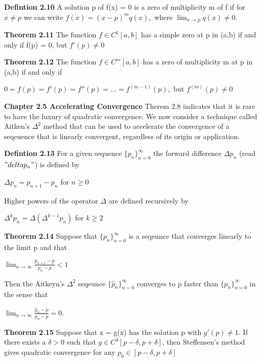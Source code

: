 \documentclass{article}
\begin{document}
\textbf {Defintion 2.10} A solution p of f(x) = 0 is a zero of multiplicity m of f if for $x \neq p$ we can write $f(x) = (x-p)^m q(x),$ where ${\lim_{x \to p}} q(x) \neq 0.$

\textbf {Theorem 2.11} The function $f \in C^1[a,b]$ has a simple zero at p in (a,b) if and only if f(p) = 0, but $f'(p) \neq 0$

\textbf {Theorem 2.12} The function $f \in C^m [a,b]$ has a zero of multiplicity m at p in (a,b) if and only if
\begin{center}
$0 = f(p) = f'(p) = f''(p) = \dots = f^{(m-1)} (p),$ but $f^{(m)} (p) \neq 0$
\end{center}

\textbf {Chapter 2.5 Accelerating Convergence} Therem 2.8 indicates that it is rare to have the luxury of quadratic convergence. We now consider a technique called Aitken's $\Delta^2$ method that can be used to accelerate the convergence of a seqeuence that is linearly convergent, regardless of its origin or application.

\textbf{Defintion 2.13} For a given sequence $\{p_n\}_{n=0}^{\infty}$ the forward difference $\Delta p_n$ (read $"delta p_n"$) is defined by
\begin{center}
$\Delta p_n = p_{n+1} - p_n$ for $n \geq 0$
\end{center}
Higher powers of the operator $\Delta$ are defined recursively by
\begin{center}
$\Delta^k p_n = \Delta(\Delta^{k-1} p_n)$ for $k \geq 2$
\end{center}

\textbf {Theorem 2.14} Suppose that $\{p_n\}_{n=0}^{\infty}$ is a seqeunce that converges linearly to the limit p and that 
\begin{center}
$\displaystyle \lim_{n \to \infty} \frac {p_{n+1} - p}{p_n - p} < 1$
\end{center}
Then the Aitkeyn's $\Delta^2$ seqeunce $\{ \hat{p}_n\}_{n=0}^{\infty}$ converges to p faster than $\{p_n\}_{n=0}^{\infty}$ in the sense that
\begin{center}
$\displaystyle \lim_{n \to \infty} \frac { \hat{p}_n - p}{p_n - p} = 0.$
\end{center}

\textbf {Theorem 2.15} Suppose that x = g(x) has the solution p with $g'(p) \neq 1$. If there exists a $\delta > 0$ such that $g \in C^3[p - \delta, p + \delta]$, then Steffensen's method gives quadratic convergence for any $p_0 \in [p - \delta, p + \delta]$
\end{document}
